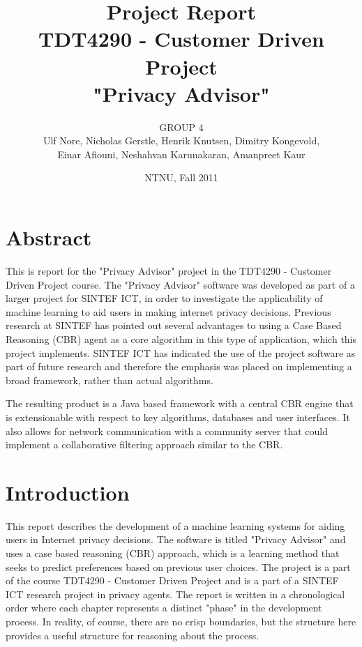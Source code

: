 \documentclass[11pt]{book}
\title{Project Report\\
TDT4290 - Customer Driven Project \\ "Privacy Advisor"}
\author{GROUP 4\\Ulf Nore, Nicholas Gerstle, Henrik Knutsen, Dimitry
  Kongevold,\\ Einar Afiouni, Neshahvan Karunakaran, Amanpreet Kaur}
\date{NTNU, Fall 2011}
\begin{document}
\frontmatter
\maketitle

\chapter*{\centering Abstract}
This is report for the "Privacy Advisor" project in the TDT4290 - Customer Driven
Project course. The "Privacy Advisor"
software was developed as part of a larger project for SINTEF ICT, in
order to investigate the applicability of machine learning to aid users in
making internet privacy decisions. Previous research at SINTEF has pointed
out several advantages to using a Case Based Reasoning (CBR) agent as
a core algorithm in this type of application, which this project implements. SINTEF ICT
has indicated the use of the project software as part of future
research and therefore the emphasis was placed on implementing a broad
framework, rather than actual algorithms.

The resulting product is a Java based framework with a central CBR
engine that is extensionable with respect to key algorithms, databases
and user interfaces. It also allows for network communication with a
community server that could implement a collaborative filtering approach 
similar to the CBR.


\dominitoc

\listoftables
\listoffigures
\tableofcontents



\chapter{Introduction}

This report describes the development of a machine learning systems for aiding users in Internet privacy decisions. The software is titled "Privacy Advisor" and uses a case based reasoning (CBR) approach, which is a learning method that seeks to predict preferences based on previous user choices. The project is a part of the course TDT4290 - Customer Driven Project and is a part of a SINTEF ICT research project in privacy agents. The report is written in a chronological order where each chapter represents a distinct "phase" in the development process. In reality, of course, there are no crisp boundaries, but the structure here provides a useful structure for reasoning about the process. 
\end{document}
